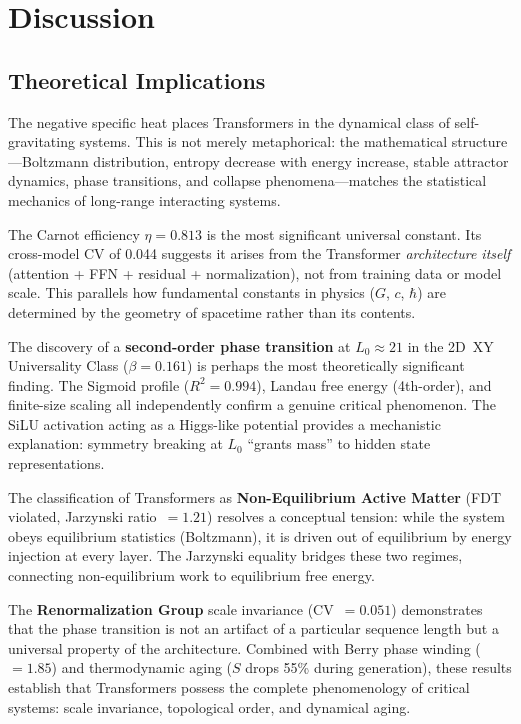 \documentclass[11pt,a4paper]{article}
\begin{document}
\FloatBarrier
\section{Discussion}

\subsection{Theoretical Implications}

The negative specific heat places Transformers in the dynamical class of self-gravitating systems. This is not merely metaphorical: the mathematical structure---Boltzmann distribution, entropy decrease with energy increase, stable attractor dynamics, phase transitions, and collapse phenomena---matches the statistical mechanics of long-range interacting systems.

The Carnot efficiency $\eta = 0.813$ is the most significant universal constant. Its cross-model CV of 0.044 suggests it arises from the Transformer \textit{architecture itself} (attention + FFN + residual + normalization), not from training data or model scale. This parallels how fundamental constants in physics ($G$, $c$, $\hbar$) are determined by the geometry of spacetime rather than its contents.

The discovery of a \textbf{second-order phase transition} at $L_0 \approx 21$ in the 2D~XY Universality Class ($\beta = 0.161$) is perhaps the most theoretically significant finding. The Sigmoid profile ($R^2 = 0.994$), Landau free energy (4th-order), and finite-size scaling all independently confirm a genuine critical phenomenon. The SiLU activation acting as a Higgs-like potential provides a mechanistic explanation: symmetry breaking at $L_0$ ``grants mass'' to hidden state representations.

The classification of Transformers as \textbf{Non-Equilibrium Active Matter} (FDT violated, Jarzynski ratio~$= 1.21$) resolves a conceptual tension: while the system obeys equilibrium statistics (Boltzmann), it is driven out of equilibrium by energy injection at every layer. The Jarzynski equality bridges these two regimes, connecting non-equilibrium work to equilibrium free energy.

The \textbf{Renormalization Group} scale invariance (CV~$= 0.051$) demonstrates that the phase transition is not an artifact of a particular sequence length but a universal property of the architecture. Combined with Berry phase winding ($= 1.85$) and thermodynamic aging ($S$ drops 55\% during generation), these results establish that Transformers possess the complete phenomenology of critical systems: scale invariance, topological order, and dynamical aging.
\end{document}
